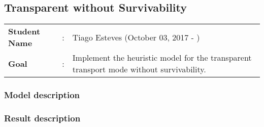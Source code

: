 \clearpage

\subsection{Transparent without Survivability}\label{heuristic_Transp_Survivability}
\begin{tcolorbox}	
\begin{tabular}{p{2.75cm} p{0.2cm} p{10.5cm}} 	
\textbf{Student Name}  &:& Tiago Esteves    (October 03, 2017 - )\\
\textbf{Goal}          &:& Implement the heuristic model for the transparent transport mode without survivability.
\end{tabular}
\end{tcolorbox}

\subsubsection{Model description}

\subsubsection{Result description}
